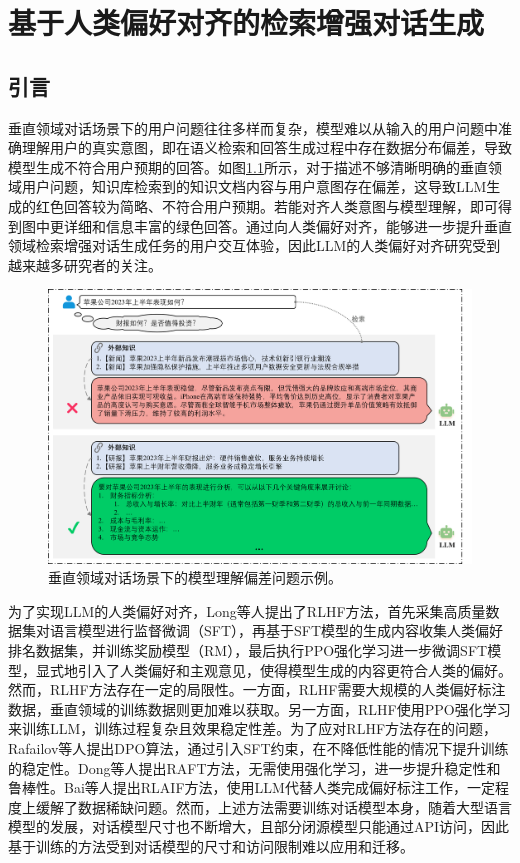 \chapter{基于人类偏好对齐的检索增强对话生成}
\section{引言}

垂直领域对话场景下的用户问题往往多样而复杂，模型难以从输入的用户问题中准确理解用户的真实意图，即在语义检索和回答生成过程中存在数据分布偏差，导致模型生成不符合用户预期的回答。如图\ref{alignment_problem_show_case}所示，对于描述不够清晰明确的垂直领域用户问题，知识库检索到的知识文档内容与用户意图存在偏差，这导致LLM生成的红色回答较为简略、不符合用户预期。若能对齐人类意图与模型理解，即可得到图中更详细和信息丰富的绿色回答。通过向人类偏好对齐，能够进一步提升垂直领域检索增强对话生成任务的用户交互体验，因此LLM的人类偏好对齐研究受到越来越多研究者的关注。

\begin{figure}[htbp]
	\centering
	\includegraphics[scale=0.45]{Fig/alignment_problem_show_case.png}
	\caption{\label{alignment_problem_show_case}垂直领域对话场景下的模型理解偏差问题示例。}
\end{figure}

为了实现LLM的人类偏好对齐，Long等人\cite{DBLP:conf/nips/Ouyang0JAWMZASR22}提出了RLHF方法，首先采集高质量数据集对语言模型进行监督微调（SFT），再基于SFT模型的生成内容收集人类偏好排名数据集，并训练奖励模型（RM），最后执行PPO强化学习进一步微调SFT模型，显式地引入了人类偏好和主观意见，使得模型生成的内容更符合人类的偏好。然而，RLHF方法存在一定的局限性。一方面，RLHF需要大规模的人类偏好标注数据，垂直领域的训练数据则更加难以获取。另一方面，RLHF使用PPO强化学习来训练LLM，训练过程复杂且效果稳定性差。为了应对RLHF方法存在的问题，Rafailov等人\cite{DBLP:conf/nips/RafailovSMMEF23}提出DPO算法，通过引入SFT约束，在不降低性能的情况下提升训练的稳定性。Dong等人\cite{DBLP:journals/corr/abs-2304-06767}提出RAFT方法，无需使用强化学习，进一步提升稳定性和鲁棒性。Bai等人\cite{DBLP:journals/corr/abs-2212-08073}提出RLAIF方法，使用LLM代替人类完成偏好标注工作，一定程度上缓解了数据稀缺问题。然而，上述方法需要训练对话模型本身，随着大型语言模型的发展，对话模型尺寸也不断增大，且部分闭源模型只能通过API访问，因此基于训练的方法受到对话模型的尺寸和访问限制难以应用和迁移。

